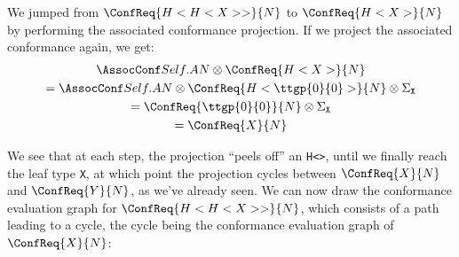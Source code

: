 \documentclass[../generics]{subfiles}
\begin{document}
We jumped from $\ConfReq{H<H<X>>}{N}$ to $\ConfReq{H<X>}{N}$ by performing the associated conformance projection. If we project the associated conformance again, we get:
\begin{gather*}
\SelfAToN \otimes \ConfReq{H<X>}{N}\\
= \SelfAToN \otimes \ConfReq{H<\ttgp{0}{0}>}{N} \otimes \Sigma_{\texttt{X}}\\
= \ConfReq{\ttgp{0}{0}}{N} \otimes \Sigma_{\texttt{X}}\\
= \ConfReq{X}{N}
\end{gather*}

We see that at each step, the projection ``peels off'' an \texttt{H<>}, until we finally reach the leaf type \verb|X|, at which point the projection cycles between $\ConfReq{X}{N}$ and $\ConfReq{Y}{N}$, as we've already seen. We can now draw the conformance evaluation graph for $\ConfReq{H<H<X>>}{N}$, which consists of a path leading to a cycle, the cycle being the conformance evaluation graph of $\ConfReq{X}{N}$:
\begin{quote}
\end{quote}
\end{document}
